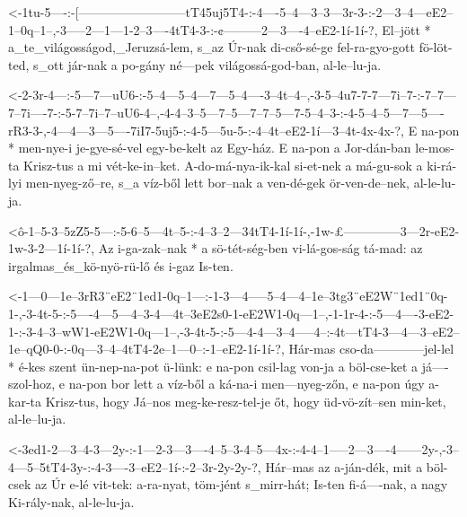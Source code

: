   {<-1tu-5----:-[--------------------------tT45uj5T4-:-4----5--4---3--3---3r-3-:-2---3--4---eE2--1--0q--1--,-3-----2---1---1-2--3----4tT4-3-:-¢---------2---3----4--eE2-1í-1í-?,}
  {  El--jött * a_te_világosságod,_Jeruzsá-lem,        s_az Úr-nak di-cső-sé-ge  fel-ra-gyo-gott fö-löt-ted, s_ott jár-nak a po-gány né---pek világossá-god-ban, al-le--lu-ja.}

  {<-2-3r-4---:-5---7---uU6-:-5--4---5--4---7---5--4----3--4t--4--,-3-5--4u7-7-7---7i--7-:-7--7---7--7i----7-:-5-7--7i--7--uU6-4--,-4-4--3--5---7--5---7--7--5---7-5--4--3-:-4-5--4--5---7---5----rR3-3-,-4---4---3---5----7iI7-5uj5-:-4-5---5u-5-:-4--4t--eE2-1í---3--4t-4x-4x-?,}
  {  E na-pon * men-nye-i     je-gye-sé-vel egy-be-kelt az Egy-ház. E na-pon a Jor-dán-ban le-mos-ta Krisz-tus a mi vét-ke-in--ket. A-do-má-nya-ik-kal si-et-nek a má-gu-sok a ki-rá-lyi men-nyeg-ző--re, s_a víz-ből lett bor--nak    a ven-dé-gek ör-ven-de--nek, al-le-lu-ja.}


  {<ô-1--5-3--5zZ5-5---:-5-6--5---4t--5-:-4--3--2---34tT4-1í-1í-,-1w-£--------------3---2r-eE2-1w-3-2---1í-1í-?,}
  {   Az i-ga-zak--nak * a sö-tét-ség-ben vi-lá-gos-ság   tá-mad: az irgalmas_és_kö-nyö-rü-lő  és i-gaz Is-ten.}

  {<-1---0---1e--3rR3¨eE2¨1ed1-0q--1---:-1-3---4-----5--4---4--1e--3tg3¨eE2W¨1ed1¨0q-1-,-3-4t-5-:-5----4---5---4--3-4---4t--3eE2s0-1-eE2W1-0q---1--,-1-1r-4-:-5---4----3-eE2-1-:-3-4--3--wW1-eE2W1-0q---1--,-3-4t-5-:-5---4-4---3--4-----4--:-4t---tT4-3---4---3--eE2--1e--qQ0-0-:-0q---3--4--4tT4-2e--1---0--:-1--eE2-1í-1í-?,}
  {  Hár-mas cso-da------------jel-lel * é-kes szent ün-nep-na-pot ü-lünk:               e na-pon csil-lag von-ja a böl-cse-ket    a já----szol-hoz, e na-pon bor lett a víz-ből a ká-na-i   men---nyeg-zőn, e na-pon úgy a-kar-ta Krisz-tus, hogy Já--nos meg-ke-resz-tel-je  őt, hogy üd-vö-zít--sen min-ket, al-le--lu-ja.}


  {<-3ed1-2---3--4-3---2y-:-1---2-3---3----4--5--3-4--5---4x-:-4-4--1-----2---3----4------2y-,-3--4---5--5tT4-3y-:-4-3----3--eE2--1í-:-2--3r-2y-2y-?,}
  {  Hár--mas az a-ján-dék, mit a böl-csek az Úr e-lé vit-tek: a-ra-nyat, töm-jént s_mirr-hát; Is-ten fi-á----nak, a nagy Ki-rály-nak, al-le-lu-ja.}

